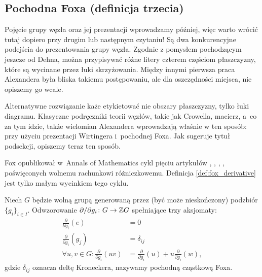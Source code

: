
\subsection{Pochodna Foxa (definicja trzecia)}
%
Pojęcie grupy węzła oraz jej prezentacji wprowadzamy później, więc warto wrócić tutaj dopiero przy drugim lub następnym czytaniu!
Są dwa konkurencyjne podejścia do prezentowania grupy węzła.
Zgodnie z pomysłem pochodzącym jeszcze od Dehna, można przypisywać różne litery czterem częściom płaszczyzny, które są wycinane przez łuki skrzyżowania.
%
Między innymi pierwsza praca Alexandera była bliska takiemu postępowaniu, ale dla oszczędności miejsca, nie opiszemy go wcale.
%

Alternatywne rozwiązanie każe etykietować nie obszary płaszczyzny, tylko łuki diagramu.
Klasyczne podręczniki teorii węzłów, takie jak \cite{crowell1963} Crowella, macierz, a~co za tym idzie, także wielomian Alexandera wprowadzają właśnie w ten sposób: przy użyciu prezentacji Wirtingera i~pochodnej Foxa.
Jak sugeruje tytuł podsekcji, opiszemy teraz ten sposób.

Fox opublikował w~Annals of Mathematics cykl pięciu artykułów \cite{fox1953}, \cite{fox1954}, \cite{fox1956}, \cite{fox1958}, \cite{fox1960} poświęconych wolnemu rachunkowi różniczkowemu.
%
Definicja \ref{def:fox_derivative} jest tylko małym wycinkiem tego cyklu.

\begin{definition}
\label{def:fox_derivative}%
    Niech $G$ będzie wolną grupą generowaną przez (być może nieskończony) podzbiór $\{g_i\}_{i \in I}$.
    Odwzorowanie $\partial/\partial g_i \colon G \to \mathbb Z G$ spełniające trzy aksjomaty:
    \begin{align}
        \frac{\partial}{\partial g_i} (e) & = 0 \\
        \frac{\partial}{\partial g_i} (g_j) & = \delta_{ij} \\
        \forall u, v \in G : \frac{\partial}{\partial g_i} (uv) & = \frac{\partial}{\partial g_i}(u) + u \frac{\partial}{\partial g_i} (w),
    \end{align}
    gdzie $\delta_{ij}$ oznacza deltę Kroneckera, nazywamy pochodną cząstkową Foxa.
\end{definition}


